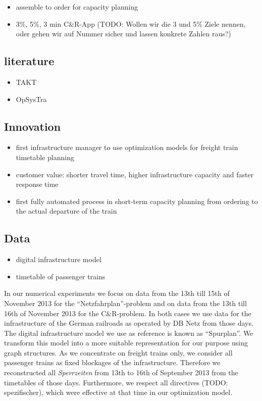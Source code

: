 \begin{itemize}
  \item assemble to order for capacity planning
  \item 3\%, 5\%, 3 min C\&R-App (TODO: Wollen wir die 3 und 5\% Ziele nennen, oder gehen wir auf Nummer sicher und lassen konkrete Zahlen raus?)
\end{itemize}

\subsection{literature}
\begin{itemize}
  \item TAKT
  \item OpSysTra
\end{itemize}

\subsection{Innovation}
\begin{itemize}
  \item first infrastructure manager to use optimization models for freight train timetable planning
  \item customer value: shorter travel time, higher infrastructure capacity and faster response time
  \item first fully automated process in short-term capacity planning from ordering to the actual departure of the train
\end{itemize}

\subsection{Data}
\begin{itemize}
  \item digital infrastructure model
  \item timetable of passenger trains
\end{itemize}
In our numerical experiments we focus on data from the 13th till 15th of November 2013 for the ``Netzfahrplan''-problem and on data from the 13th till 16th of November 2013 for the C\&R-problem. In both cases we use data for the infrastructure of the German railroads as operated by DB Netz from those days. The digital infrastructure model we use as reference is known as ``Spurplan''. We transform this model into a more suitable representation for our purpose using graph structures. As we concentrate on freight trains only, we consider all passenger trains as fixed blockages of the infrastructure. Therefore we reconstructed all \textit{Sperrzeiten} from 13th to 16th of September 2013 from the timetables of those days. Furthermore, we respect all directives (TODO: spezifischer), which were effective at that time in our optimization model.

